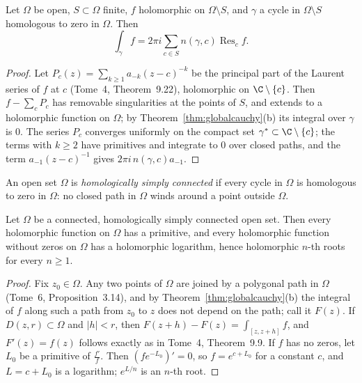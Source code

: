 \begin{corollary}\label{cor:globalresidue}
Let $\Omega$ be open, $S\subset\Omega$ finite, $f$ holomorphic on $\Omega\setminus S$, and $\gamma$ a cycle in $\Omega\setminus S$ homologous to zero in $\Omega$. Then
\[
\int_\gamma f=2\pi i\sum_{c\in S}n(\gamma,c)\operatorname{Res}_cf.
\]
\end{corollary}
\begin{proof}
Let $P_c(z)=\sum_{k\ge1}a_{-k}(z-c)^{-k}$ be the principal part of the Laurent series of $f$ at $c$ (Tome~4, Theorem~9.22), holomorphic on $\C\setminus\{c\}$. Then $f-\sum_cP_c$ has removable
singularities at the points of $S$, and extends to a holomorphic function on $\Omega$; by Theorem~\ref{thm:globalcauchy}(b) its integral over $\gamma$ is $0$. The series $P_c$ converges uniformly on the
compact set $\gamma^*\subset\C\setminus\{c\}$; the terms with $k\ge2$ have primitives and integrate to $0$ over closed paths, and the term $a_{-1}(z-c)^{-1}$ gives $2\pi i\,n(\gamma,c)a_{-1}$.
\end{proof}

An open set $\Omega$ is \emph{homologically simply connected} if every cycle in $\Omega$ is homologous to zero in $\Omega$: no closed path in $\Omega$ winds around a point outside $\Omega$.

\begin{corollary}\label{cor:hsc}
Let $\Omega$ be a connected, homologically simply connected open set. Then every holomorphic function on $\Omega$ has a primitive, and every holomorphic function without zeros on $\Omega$ has a
holomorphic logarithm, hence holomorphic $n$-th roots for every $n\ge1$.
\end{corollary}
\begin{proof}
Fix $z_0\in\Omega$. Any two points of $\Omega$ are joined by a polygonal path in $\Omega$ (Tome~6, Proposition~3.14), and by Theorem~\ref{thm:globalcauchy}(b) the integral of $f$ along such a path from
$z_0$ to $z$ does not depend on the path; call it $F(z)$. If $D(z,r)\subset\Omega$ and $|h|<r$, then $F(z+h)-F(z)=\int_{[z,z+h]}f$, and $F'(z)=f(z)$ follows exactly as in Tome~4, Theorem~9.9. If $f$
has no zeros, let $L_0$ be a primitive of $\frac{f'}f$. Then $(fe^{-L_0})'=0$, so $f=e^{c+L_0}$ for a constant $c$, and $L=c+L_0$ is a logarithm; $e^{L/n}$ is an $n$-th root.
\end{proof}

